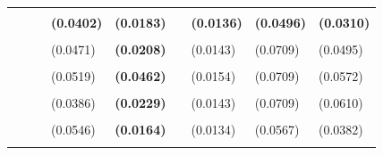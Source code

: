 \documentclass[
  12pt,
]{article}
\begin{document}
\begin{table}[H]
{\begin{tabular}[t]{llll>{}lllll}
\addlinespace
\textbf{\cellcolor{gray!6}{1.sided weighted.cycle}} & \textbf{\cellcolor{gray!6}{6.2094}} & \textbf{\cellcolor{gray!6}{1.1361}} & \textbf{\cellcolor{gray!6}{0.5325}} & \textbf{\textbf{\cellcolor{gray!6}{0.5811}}} & \textbf{\cellcolor{gray!6}{-1.0639}} & \textbf{\cellcolor{gray!6}{0.6827}} & \textbf{\cellcolor{gray!6}{0.1111}} & \textbf{\cellcolor{gray!6}{0.4784}}\\
\textbf{} & \textbf{} & \textbf{} & \textbf{(0.0402)} & \textbf{\textbf{(0.0183)}} & \textbf{} & \textbf{(0.0136)} & \textbf{(0.0496)} & \textbf{(0.0310)}\\
\addlinespace
\cellcolor{gray!6}{c.linear} & \cellcolor{gray!6}{-9.3676} & \cellcolor{gray!6}{-14.4409} & \cellcolor{gray!6}{0.5787} & \textbf{\cellcolor{gray!6}{0.5774}} & \cellcolor{gray!6}{-0.9783} & \cellcolor{gray!6}{0.6294} & \cellcolor{gray!6}{0.2222} & \cellcolor{gray!6}{0.4455}\\
 &  &  & (0.0471) & \textbf{(0.0208)} &  & (0.0143) & (0.0709) & (0.0495)\\
\addlinespace
\cellcolor{gray!6}{c.bn2.r20} & \cellcolor{gray!6}{-16.6411} & \cellcolor{gray!6}{-21.7144} & \cellcolor{gray!6}{0.6760} & \textbf{\cellcolor{gray!6}{0.5751}} & \cellcolor{gray!6}{0.1470} & \cellcolor{gray!6}{0.4510} & \cellcolor{gray!6}{0.3056} & \cellcolor{gray!6}{0.2968}\\
 &  &  & (0.0519) & \textbf{(0.0462)} &  & (0.0154) & (0.0709) & (0.0572)\\
\addlinespace
\cellcolor{gray!6}{c.hamilton13} & \cellcolor{gray!6}{6.5749} & \cellcolor{gray!6}{1.5016} & \cellcolor{gray!6}{0.5468} & \textbf{\cellcolor{gray!6}{0.5710}} & \cellcolor{gray!6}{3.6354} & \cellcolor{gray!6}{0.6206} & \cellcolor{gray!6}{0.3056} & \cellcolor{gray!6}{0.4785}\\
 &  &  & (0.0386) & \textbf{(0.0229)} &  & (0.0143) & (0.0709) & (0.0610)\\
\addlinespace
\cellcolor{gray!6}{c.ma} & \cellcolor{gray!6}{-11.6401} & \cellcolor{gray!6}{-16.7133} & \cellcolor{gray!6}{0.5572} & \textbf{\cellcolor{gray!6}{0.5457}} & \cellcolor{gray!6}{-0.2250} & \cellcolor{gray!6}{0.7220} & \cellcolor{gray!6}{0.1667} & \cellcolor{gray!6}{0.5491}\\
 &  &  & (0.0546) & \textbf{(0.0164)} &  & (0.0134) & (0.0567) & (0.0382)\\
\addlinespace
\cellcolor{gray!6}{c.hamilton28.panel} & \cellcolor{gray!6}{-7.8687} & \cellcolor{gray!6}{-12.9420} & \cellcolor{gray!6}{0.5392} & \textbf{\cellcolor{gray!6}{0.5384}} & \cellcolor{gray!6}{-1.7750} & \cellcolor{gray!6}{0.6958} & \cellcolor{gray!6}{0.2778} & \cellcolor{gray!6}{0.5613}\\

\end{tabular}}
\end{table}
\end{document}
